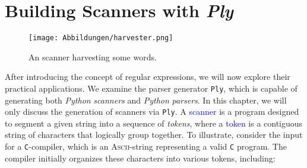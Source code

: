 \chapter{Building Scanners with \textsl{Ply} \label{chapter:ply-lex}}
\begin{figure}[h] 
\centering
  \texttt{[image: Abbildungen/harvester.png]}
\caption{An scanner harvesting some words.}
\label{fig:harvester.png}
\end{figure}


After introducing the concept of regular expressions, we will now explore their practical applications. We
examine the parser generator \texttt{Ply}, which is capable of generating both \textsl{Python}
\emph{scanners} and \textsl{Python} \emph{parsers}.  In this chapter, we will only discuss the generation of
scanners via \texttt{Ply}.
A \textcolor{blue}{scanner} is a program
designed to segment a given string into a sequence of \emph{tokens}, where a
\textcolor{blue}{token} is a contiguous string of characters that logically group together. To
illustrate, consider the input for a \texttt{C}-compiler, which is an \textsc{Ascii}-string representing a
valid \texttt{C} program. The compiler initially organizes these characters into various tokens, including: 

